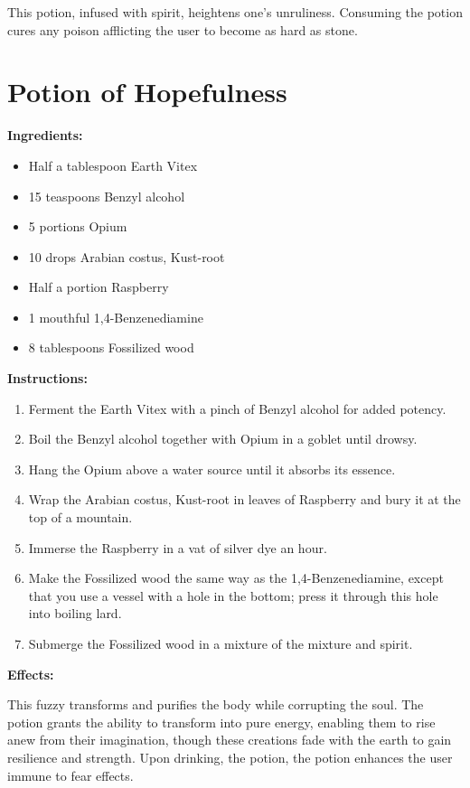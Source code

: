 \documentclass{article}
\begin{document}
This potion, infused with spirit, heightens one's unruliness. Consuming the potion cures any poison afflicting the user to become as hard as stone.

\newpage
\section*{Potion of Hopefulness}

\textbf{Ingredients:}

\begin{itemize}
  \item Half a tablespoon Earth Vitex
  \item 15 teaspoons Benzyl alcohol
  \item 5 portions Opium
  \item 10 drops Arabian costus, Kust-root
  \item Half a portion Raspberry
  \item 1 mouthful 1,4-Benzenediamine
  \item 8 tablespoons Fossilized wood
\end{itemize}

\textbf{Instructions:}

\begin{enumerate}
  \item Ferment the Earth Vitex with a pinch of Benzyl alcohol for added potency.
  \item Boil the Benzyl alcohol together with Opium in a goblet until drowsy.
  \item Hang the Opium above a water source until it absorbs its essence.
  \item Wrap the Arabian costus, Kust-root in leaves of Raspberry and bury it at the top of a mountain.
  \item Immerse the Raspberry in a vat of silver dye an hour.
  \item Make the Fossilized wood the same way as the 1,4-Benzenediamine, except that you use a vessel with a hole in the bottom; press it through this hole into boiling lard.
  \item Submerge the Fossilized wood in a mixture of the mixture and spirit.
\end{enumerate}

\textbf{Effects:}

This fuzzy transforms and purifies the body while corrupting the soul. The potion grants the ability to transform into pure energy, enabling them to rise anew from their imagination, though these creations fade with the earth to gain resilience and strength. Upon drinking, the potion, the potion enhances the user immune to fear effects.
\end{document}
